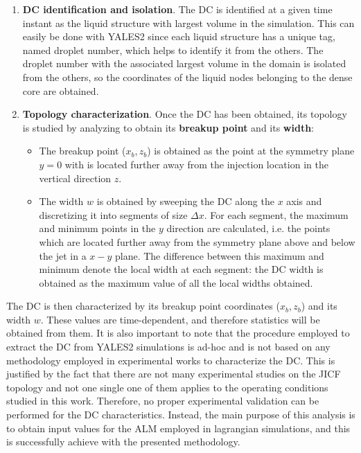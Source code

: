\begin{enumerate}

	\item \textbf{DC identification and isolation}. The DC is identified at a given time instant as the liquid structure with largest volume in the simulation. This can easily be done with YALES2 since each liquid structure has a unique tag, named droplet number, which helps to identify it from the others. The droplet number with the associated largest volume in the domain is isolated from the others, so the coordinates of the liquid nodes belonging to the dense core are obtained.
	
	\item \textbf{Topology characterization}. Once the DC has been obtained, its topology is studied by analyzing to obtain its \textbf{breakup point} and its \textbf{width}:
	
	\begin{itemize}
	
	
		\item The breakup point ($x_b, z_b$) is obtained as the point at the symmetry plane $y = 0$ with is located further away from the injection location in the vertical direction $z$.
		
		\item The width $w$ is obtained by sweeping the DC along the $x$ axis and discretizing it into segments of size $\Delta x$. For each segment, the maximum and minimum points in the $y$ direction are calculated, i.e. the points which are located further away from the symmetry plane above and below the jet in a $x-y$ plane. The difference between this maximum and minimum denote the local width at each segment: the DC width is obtained as the maximum value of all the local widths obtained.
	
	\end{itemize}
	
\end{enumerate}

The DC is then characterized by its breakup point coordinates ($x_b, z_b$) and its width $w$. These values are time-dependent, and therefore statistics will be obtained from them. It is also important to note that the procedure employed to extract the DC from YALES2 simulations is ad-hoc and is not based on any methodology employed in experimental works to characterize the DC. This is justified by the fact that there are not many experimental studies on the JICF topology and not one single one of them applies to the operating conditions studied in this work. Therefore, no proper experimental validation can be performed for the DC characteristics. Instead, the main purpose of this analysis is to obtain input values for the ALM employed in lagrangian simulations, and this is successfully achieve with the presented methodology.

